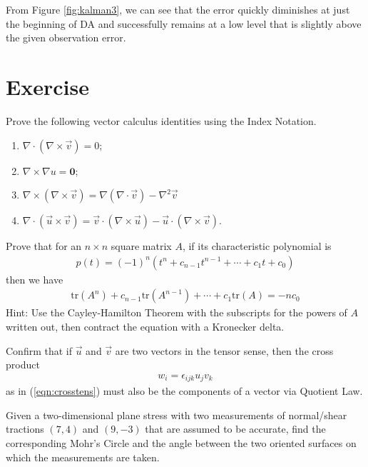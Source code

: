 From Figure \ref{fig:kalman3}, we can see that the error quickly diminishes at just the beginning of DA and successfully remains at a low level that is slightly above the given observation error.

\section{Exercise}

\begin{Exercise}
Prove the following vector calculus identities using the Index Notation.
\begin{enumerate}[label=(\alph*)]
    \item $\nabla \cdot (\nabla \times \vec{v}) = 0$;
    \item $\nabla \times \nabla u = \textbf{0}$;
    \item $\nabla \times (\nabla \times \vec{v}) = \nabla (\nabla \cdot \vec{v}) - \nabla^2 \vec{v}$
    \item $\nabla \cdot (\vec{u} \times \vec{v}) = \vec{v} \cdot (\nabla \times \vec{u}) - \vec{u} \cdot (\nabla \times \vec{v})$.
\end{enumerate}
\end{Exercise}

\begin{Exercise}
Prove that for an $n \times n$ square matrix $A$, if its characteristic polynomial is
\begin{align*}
p(t) = (-1)^n(t^n + c_{n-1}t^{n-1} + \cdots + c_1 t + c_0)
\end{align*}
then we have
\begin{align*}
\text{tr}(A^n) + c_{n-1}\text{tr}(A^{n-1}) + \cdots + c_1 \text{tr}(A) = -nc_0
\end{align*}
Hint: Use the Cayley-Hamilton Theorem with the subscripts for the powers of $A$ written out, then contract the equation with a Kronecker delta.
\end{Exercise}

\begin{Exercise}
Confirm that if $\vec{u}$ and $\vec{v}$ are two vectors in the tensor sense, then the cross product
\begin{align*}
w_i = \epsilon_{ijk}u_jv_k
\end{align*}
as in (\ref{eqn:crosstens}) must also be the components of a vector via Quotient Law.
\end{Exercise}

\begin{Exercise}
Given a two-dimensional plane stress with two measurements of normal/shear tractions $(7,4)$ and $(9,-3)$ that are assumed to be accurate, find the corresponding Mohr's Circle and the angle between the two oriented surfaces on which the measurements are taken.
\end{Exercise}

